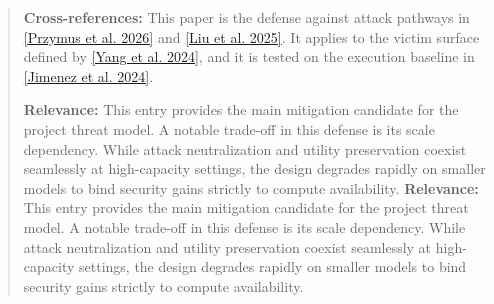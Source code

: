 \documentclass[11pt, a4paper]{article}
\begin{document}
\begin{quote}
\vspace{0.5em}
\textbf{Cross-references:} This paper is the defense against attack pathways in \hyperlink{p4}{[Przymus et al. 2026]} and \hyperlink{p3}{[Liu et al. 2025]}. It applies to the victim surface defined by \hyperlink{p7}{[Yang et al. 2024]}, and it is tested on the execution baseline in \hyperlink{p2}{[Jimenez et al. 2024]}.

\vspace{0.5em}
\textbf{Relevance:} This entry provides the main mitigation candidate for the project threat model. A notable trade-off in this defense is its scale dependency. While attack neutralization and utility preservation coexist seamlessly at high-capacity settings, the design degrades rapidly on smaller models to bind security gains strictly to compute availability.
\textbf{Relevance:} This entry provides the main mitigation candidate for the project threat model. A notable trade-off in this defense is its scale dependency. While attack neutralization and utility preservation coexist seamlessly at high-capacity settings, the design degrades rapidly on smaller models to bind security gains strictly to compute availability.
\end{quote}
\end{document}
